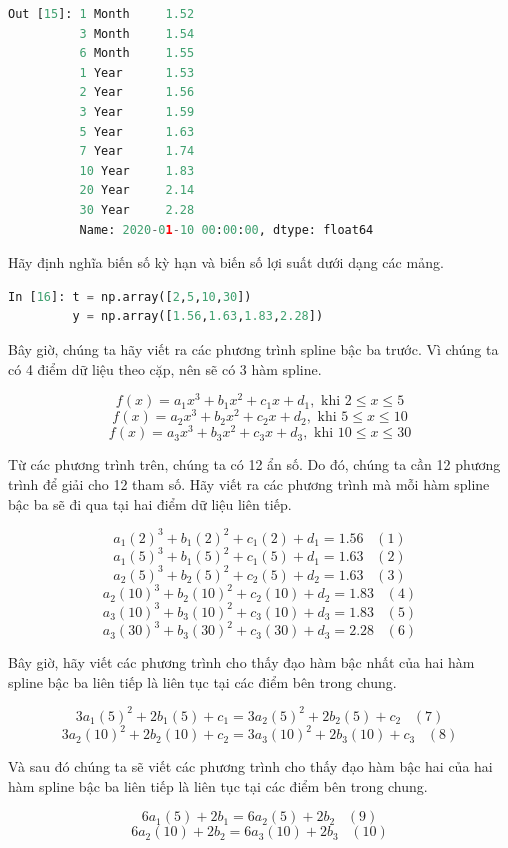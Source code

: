\begin{lstlisting}[language=Python]
Out [15]: 1 Month     1.52
          3 Month     1.54
          6 Month     1.55
          1 Year      1.53
          2 Year      1.56
          3 Year      1.59
          5 Year      1.63
          7 Year      1.74
          10 Year     1.83
          20 Year     2.14
          30 Year     2.28
          Name: 2020-01-10 00:00:00, dtype: float64
\end{lstlisting}

Hãy định nghĩa biến số kỳ hạn và biến số lợi suất dưới dạng các mảng.

\begin{lstlisting}[language=Python]
In [16]: t = np.array([2,5,10,30])
         y = np.array([1.56,1.63,1.83,2.28])
\end{lstlisting}

Bây giờ, chúng ta hãy viết ra các phương trình spline bậc ba trước. Vì chúng ta có 4 điểm dữ liệu theo cặp, nên sẽ có 3 hàm spline.

$$f(x)=a_{1}x^{3}+b_{1}x^{2}+c_{1}x+d_{1}, \text{ khi } 2\le x\le 5$$
$$f(x)=a_{2}x^{3}+b_{2}x^{2}+c_{2}x+d_{2}, \text{ khi } 5\le x\le 10$$
$$f(x)=a_{3}x^{3}+b_{3}x^{2}+c_{3}x+d_{3}, \text{ khi } 10\le x\le 30$$

Từ các phương trình trên, chúng ta có 12 ẩn số. Do đó, chúng ta cần 12 phương trình để giải cho 12 tham số. Hãy viết ra các phương trình mà mỗi hàm spline bậc ba sẽ đi qua tại hai điểm dữ liệu liên tiếp.

$$a_{1}(2)^{3}+b_{1}(2)^{2}+c_{1}(2)+d_{1}=1.56\;\;\;(1)$$
$$a_{1}(5)^{3}+b_{1}(5)^{2}+c_{1}(5)+d_{1}=1.63\;\;\;(2)$$
$$a_{2}(5)^{3}+b_{2}(5)^{2}+c_{2}(5)+d_{2}=1.63\;\;\;(3)$$
$$a_{2}(10)^{3}+b_{2}(10)^{2}+c_{2}(10)+d_{2}=1.83\;\;\;(4)$$
$$a_{3}(10)^{3}+b_{3}(10)^{2}+c_{3}(10)+d_{3}=1.83\;\;\;(5)$$
$$a_{3}(30)^{3}+b_{3}(30)^{2}+c_{3}(30)+d_{3}=2.28\;\;\;(6)$$

Bây giờ, hãy viết các phương trình cho thấy đạo hàm bậc nhất của hai hàm spline bậc ba liên tiếp là liên tục tại các điểm bên trong chung.

$$3a_{1}(5)^{2}+2b_{1}(5)+c_{1}=3a_{2}(5)^{2}+2b_{2}(5)+c_{2}\;\;\;(7)$$
$$3a_{2}(10)^{2}+2b_{2}(10)+c_{2}=3a_{3}(10)^{2}+2b_{3}(10)+c_{3}\;\;\;(8)$$

Và sau đó chúng ta sẽ viết các phương trình cho thấy đạo hàm bậc hai của hai hàm spline bậc ba liên tiếp là liên tục tại các điểm bên trong chung.

$$6a_{1}(5)+2b_{1}=6a_{2}(5)+2b_{2}\;\;\;(9)$$
$$6a_{2}(10)+2b_{2}=6a_{3}(10)+2b_{3}\;\;\;(10)$$

